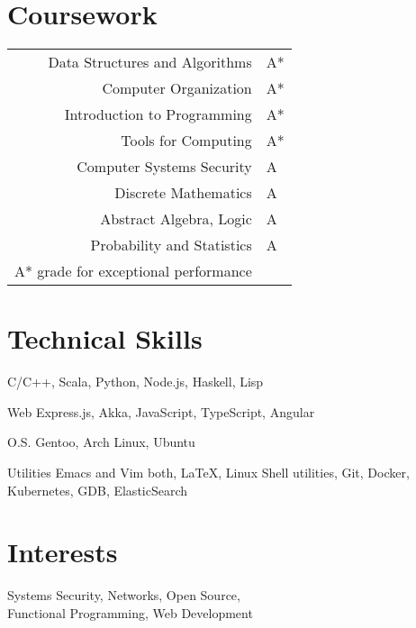 \documentclass{tccv}
\begin{document}
\section{Coursework}
\begin{tabularx}{\linewidth}{ r l }
  Data Structures and Algorithms & A*\\
  Computer Organization & A*\\
  Introduction to Programming & A*\\
  Tools for Computing & A*\\
  Computer Systems Security & A\\
  Discrete Mathematics & A\\
  Abstract Algebra, Logic & A\\
  Probability and Statistics & A\\
  \footnotesize{A* grade for exceptional performance}&\\
\end{tabularx}

\vspace{-0.4cm}
\section{Technical Skills}

C/C++, Scala, Python, Node.js, Haskell, Lisp

\vspace{0.2cm}
\begin{factlist}

\item{\small{Web}}
  {Express.js, Akka, JavaScript, TypeScript, Angular}

  \vspace{-0.2cm}
\item{\small{O.S.}}
  {Gentoo, Arch Linux, Ubuntu}

  \vspace{-0.2cm}
\item {\small{Utilities}}
  {Emacs and Vim both, \LaTeX, Linux Shell utilities, Git, Docker,
    Kubernetes, GDB, ElasticSearch}

\end{factlist}

\vspace{-0.3cm}
\section{Interests}
Systems Security, Networks, Open Source,\\Functional
Programming, Web Development
\end{document}
